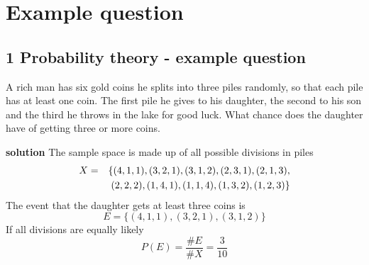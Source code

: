 
\ifind
\section*{Example question}
\else
\subsection*{1 Probability theory - example question}
\fi

A rich man has six gold coins he splits into three piles randomly, so
that each pile has at least one coin. The first pile he gives to his
daughter, the second to his son and the third he throws in the lake
for good luck. What chance does the daughter have of getting three or more coins.

\noindent \textbf{solution} The sample space is made up of all possible divisions in piles
\begin{eqnarray}
  X&=&\{(4,1,1),(3,2,1),(3,1,2),(2,3,1),(2,1,3),\cr &&(2,2,2),(1,4,1),(1,1,4),(1,3,2),(1,2,3)\}
\end{eqnarray}
The event that the daughter gets at least three coins is
\begin{equation}
  E=\{(4,1,1),(3,2,1),(3,1,2)\}
\end{equation}
If all divisions are equally likely
\begin{equation}
  P(E)=\frac{\#E}{\#X}=\frac{3}{10}
\end{equation}
